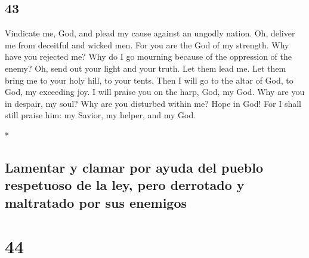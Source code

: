 \begin{paracol}{2}
\switchcolumn
\begin{otherlanguage}{english}

\hypertarget{section-85}{%
\section{43}\label{section-85}}

 Vindicate me, God, and plead my cause against an ungodly
nation. Oh, deliver me from deceitful and wicked men.  For
you are the God of my strength. Why have you rejected me? Why do I go
mourning because of the oppression of the enemy?  Oh, send
out your light and your truth. Let them lead me. Let them bring me to
your holy hill, to your tents.  Then I will go to the
altar of God, to God, my exceeding joy. I will praise you on the harp,
God, my God.  Why are you in despair, my soul? Why are you
disturbed within me? Hope in God! For I shall still praise him: my
Savior, my helper, and my God.

\end{otherlanguage}

\switchcolumn[0]*

\hypertarget{lamentar-y-clamar-por-ayuda-del-pueblo-respetuoso-de-la-ley-pero-derrotado-y-maltratado-por-sus-enemigos}{%
\subsection{Lamentar y clamar por ayuda del pueblo respetuoso de la ley,
pero derrotado y maltratado por sus
enemigos}\label{lamentar-y-clamar-por-ayuda-del-pueblo-respetuoso-de-la-ley-pero-derrotado-y-maltratado-por-sus-enemigos}}

\hypertarget{section-86}{%
\section{44}\label{section-86}}


\end{paracol}

